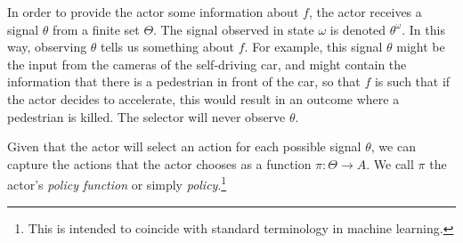 In order to provide the actor some information about $f$, the actor receives a signal $\theta$ from a finite set $\Theta$. The signal observed in state $\omega$ is denoted $\theta^\omega$. In this way, observing $\theta$ tells us something about $f$. For example, this signal $\theta$ might be the input from the cameras of the self-driving car, and might contain the information that there is a pedestrian in front of the car, so that $f$ is such that if the actor decides to accelerate, this would result in an outcome where a pedestrian is killed. The selector will never observe $\theta$. 

Given that the actor will select an action for each possible signal $\theta$, we can capture the actions that the actor chooses as a function $\pi\colon\Theta \to A$. We call $\pi$ the actor's \textit{policy function} or simply \textit{policy}.\footnote{This is intended to coincide with standard terminology in machine learning.}  

